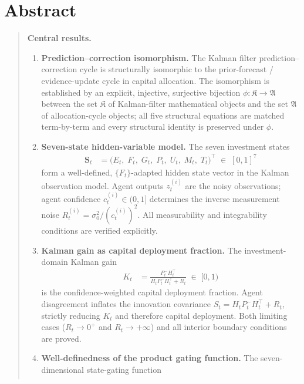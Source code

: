 \documentclass[12pt,openany]{book}
\newcommand{\calE}{\mathcal{E}}
\newcommand{\calF}{\mathcal{F}}
\newcommand{\calG}{\mathcal{G}}
\newcommand{\calP}{\mathcal{P}}
\newcommand{\calU}{\mathcal{U}}
\newcommand{\calM}{\mathcal{M}}
\newcommand{\calT}{\mathcal{T}}
\numberwithin{equation}{chapter}
\theoremstyle{plain}
\theoremstyle{definition}
\theoremstyle{remark}
\newenvironment{abstract}{%
  \chapter*{Abstract}
  \begin{quote}\small
}{%
  \end{quote}
}
\def\mathcal#1{#1}%
\begin{document}
\begin{abstract}
\medskip
\noindent\textbf{Central results.}
\begin{enumerate}[label=(\roman*), leftmargin=2.5em, itemsep=3pt,
                  parsep=0pt, topsep=3pt]
  \item \textbf{Prediction--correction isomorphism.}
        The Kalman filter prediction--correction cycle is structurally
        isomorphic to the prior-forecast / evidence-update cycle in
        capital allocation.  The isomorphism is established by an
        explicit, injective, surjective bijection
        $\phi\colon \mathfrak{K} \to \mathfrak{A}$
        between the set $\mathfrak{K}$ of Kalman-filter mathematical
        objects and the set $\mathfrak{A}$ of allocation-cycle objects;
        all five structural equations are matched term-by-term and
        every structural identity is preserved under $\phi$.
  \item \textbf{Seven-state hidden-variable model.}
        The seven investment states
        \begin{align*}
          \mathbf{S}_t
          &= \bigl(\calE_t,\;\calF_t,\;\calG_t,\;\calP_t,\;
                   \calU_t,\;\calM_t,\;\calT_t\bigr)^{\!\top}
          \;\in\;[0,1]^7
        \end{align*}
        form a well-defined, $\{\calF_t\}$-adapted hidden state vector
        in the Kalman observation model.  Agent outputs $z_t^{(i)}$
        are the noisy observations; agent confidence
        $c_t^{(i)}\in(0,1]$ determines the inverse measurement noise
        $R_t^{(i)} = \sigma_0^2/(c_t^{(i)})^2$.  All measurability
        and integrability conditions are verified explicitly.
  \item \textbf{Kalman gain as capital deployment fraction.}
        The investment-domain Kalman gain
        \begin{align*}
          K_t
          &= \frac{P_t^- H_t^\top}
                  {H_t P_t^- H_t^\top + R_t}
          \;\in\;[0,1)
        \end{align*}
        is the confidence-weighted capital deployment fraction.
        Agent disagreement inflates the innovation covariance
        $S_t = H_t P_t^- H_t^\top + R_t$, strictly reducing $K_t$
        and therefore capital deployment.  Both limiting cases
        ($R_t \to 0^+$ and $R_t \to +\infty$) and all interior
        boundary conditions are proved.
  \item \textbf{Well-definedness of the product gating function.}
        The seven-dimensional state-gating function
        \begin{align*}

\end{align*}
\end{enumerate}
\end{abstract}
\end{document}
